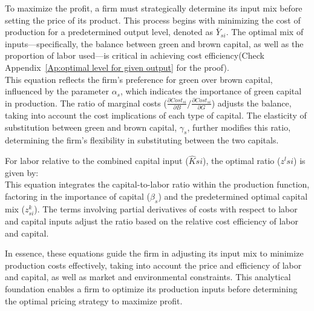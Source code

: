 To maximize the profit, a firm must strategically determine its input mix before setting the price of its product. This process begins with minimizing the cost of production for a predetermined output level, denoted as $\bar{Y}_{si}$. The optimal mix of inputs—specifically, the balance between green and brown capital, as well as the proportion of labor used—is critical in achieving cost efficiency(Check Appendix~\ref{Ap:optimal level for given output} for the proof).
\begin{equation}\label{eq:capital_optimal_ratio}
  
\end{equation}
This equation reflects the firm's preference for green over brown capital, influenced by the parameter $\alpha_s$, which indicates the importance of green capital in production. The ratio of marginal costs ($\frac{\partial Cost_{si}}{\partial B}/\frac{\partial Cost_{si}}{\partial G}$) adjusts the balance, taking into account the cost implications of each type of capital. The elasticity of substitution between green and brown capital, $\gamma_s$, further modifies this ratio, determining the firm's flexibility in substituting between the two capitals.

For labor relative to the combined capital input ($\hat{K}{si}$), the optimal ratio ($z^l{si}$) is given by:
\begin{equation}\label{eq:labor_optimal_ratio}
  
\end{equation}
This equation integrates the capital-to-labor ratio within the production function, factoring in the importance of capital ($\beta_s$) and the predetermined optimal capital mix ($z^k_{si}$). The terms involving partial derivatives of costs with respect to labor and capital inputs adjust the ratio based on the relative cost efficiency of labor and capital.

In essence, these equations guide the firm in adjusting its input mix to minimize production costs effectively, taking into account the price and efficiency of labor and capital, as well as market and environmental constraints. This analytical foundation enables a firm to optimize its production inputs before determining the optimal pricing strategy to maximize profit.

